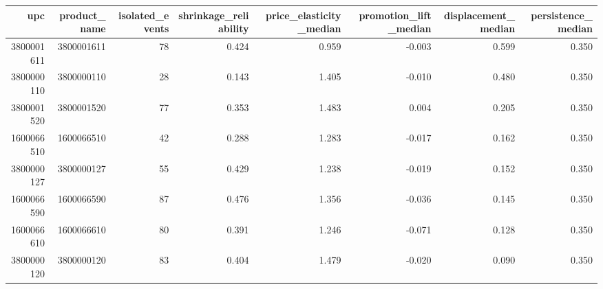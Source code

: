 \begin{tabular}{rrrrrrrr}
\toprule
upc & product_name & isolated_events & shrinkage_reliability & price_elasticity_median & promotion_lift_median & displacement_median & persistence_median \\
\midrule
3800001611 & 3800001611 & 78 & 0.424 & 0.959 & -0.003 & 0.599 & 0.350 \\
3800000110 & 3800000110 & 28 & 0.143 & 1.405 & -0.010 & 0.480 & 0.350 \\
3800001520 & 3800001520 & 77 & 0.353 & 1.483 & 0.004 & 0.205 & 0.350 \\
1600066510 & 1600066510 & 42 & 0.288 & 1.283 & -0.017 & 0.162 & 0.350 \\
3800000127 & 3800000127 & 55 & 0.429 & 1.238 & -0.019 & 0.152 & 0.350 \\
1600066590 & 1600066590 & 87 & 0.476 & 1.356 & -0.036 & 0.145 & 0.350 \\
1600066610 & 1600066610 & 80 & 0.391 & 1.246 & -0.071 & 0.128 & 0.350 \\
3800000120 & 3800000120 & 83 & 0.404 & 1.479 & -0.020 & 0.090 & 0.350 \\
\bottomrule
\end{tabular}
